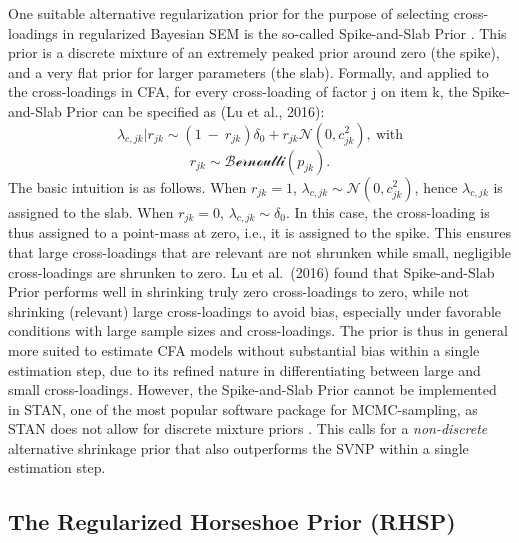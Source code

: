 \documentclass[]{interact}
\theoremstyle{plain}%
\theoremstyle{definition}
\theoremstyle{remark}
\begin{document}
One suitable alternative regularization prior for the purpose of
selecting cross-loadings in regularized Bayesian SEM is the so-called
Spike-and-Slab Prior
\citep{george_variable_1993, ishwaran_spike_2005, mitchell_bayesian_1988}.
This prior is a discrete mixture of an extremely peaked prior around
zero (the spike), and a very flat prior for larger parameters (the
slab). Formally, and applied to the cross-loadings in CFA, for every
cross-loading of factor j on item k, the Spike-and-Slab Prior can be
specified as (Lu et al., 2016):
\[\lambda_{c,jk} |r_{jk} \sim (1 \ - \ r_{jk})\delta_0 + r_{jk} \mathcal{N}(0, c^2_{jk}) , \ \text{with}\]
\[r_{jk} \sim \mathcal{Bernoulli}(p_{jk}).\] The basic intuition is as
follows. When \(r_{jk} = 1\),
\(\lambda_{c,jk} \sim \mathcal{N}(0, c^2_{jk})\), hence
\(\lambda_{c,jk}\) is assigned to the slab. When \(r_{jk} = 0\),
\(\lambda_{c,jk} \sim \delta_0\). In this case, the cross-loading is
thus assigned to a point-mass at zero, i.e., it is assigned to the
spike. This ensures that large cross-loadings that are relevant are not
shrunken while small, negligible cross-loadings are shrunken to zero. Lu
et al.~(2016) found that Spike-and-Slab Prior performs well in shrinking
truly zero cross-loadings to zero, while not shrinking (relevant) large
cross-loadings to avoid bias, especially under favorable conditions with
large sample sizes and cross-loadings. The prior is thus in general more
suited to estimate CFA models without substantial bias within a single
estimation step, due to its refined nature in differentiating between
large and small cross-loadings. However, the Spike-and-Slab Prior cannot
be implemented in STAN, one of the most popular software package for
MCMC-sampling, as STAN does not allow for discrete mixture priors
\citep{stan_development_team_stan_2021, betancourt_conceptual_2018}.
This calls for a \emph{non-discrete} alternative shrinkage prior that
also outperforms the SVNP within a single estimation step.

\hypertarget{the-regularized-horseshoe-prior-rhsp}{%
\subsection{The Regularized Horseshoe Prior
(RHSP)}\label{the-regularized-horseshoe-prior-rhsp}}
\end{document}
